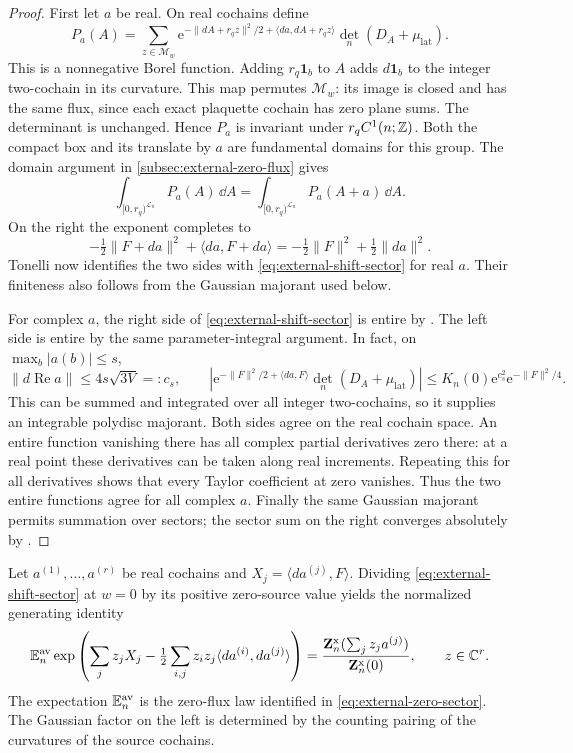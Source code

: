 \begin{proof}
First let $a$ be real. On real cochains define
\[
 P_a(A)=\sum_{z\in\mathcal M_w}
  \mathrm e^{-\|dA+r_qz\|^2/2+\langle da,dA+r_qz\rangle}
                            \det_n(D_A+\mu_{\mathrm{lat}}).
\]
This is a nonnegative Borel function. Adding
$r_q\mathbf1_b$ to $A$ adds $d\mathbf1_b$ to the
integer two-cochain in its curvature. This map
permutes $\mathcal M_w$: its image is closed
and has the same flux, since each exact plaquette
cochain has zero plane sums. The determinant
is unchanged. Hence $P_a$ is invariant under
$r_qC^1(n;\mathbb Z)$. Both the compact box and its
translate by $a$ are fundamental domains for
this group. The domain argument in
\cref{subsec:external-zero-flux} gives
\[
 \int_{[0,r_q)^{\mathcal L_n}}P_a(A)\,\dd A
        =\int_{[0,r_q)^{\mathcal L_n}}P_a(A+a)\,\dd A.
\]
On the right the exponent completes to
\[
 -\tfrac12\|F+da\|^2+\langle da,F+da\rangle
                  =-\tfrac12\|F\|^2+\tfrac12\|da\|^2.
\]
Tonelli now identifies the two sides with
\eqref{eq:external-shift-sector} for real $a$.
Their finiteness also follows from the Gaussian
majorant used below.

For complex $a$, the right side of
\eqref{eq:external-shift-sector} is entire by
.
The left side is entire by the same
parameter-integral argument. In fact, on
$\max_b|a(b)|\le s$,
\[
 \|d\operatorname{Re}a\|\le4s\sqrt{3V}=:c_s,
 \qquad
 \left|\mathrm e^{-\|F\|^2/2+\langle da,F\rangle}
                            \det_n(D_A+\mu_{\mathrm{lat}})\right|
                  \le K_n(0)\mathrm e^{c_s^2}\mathrm e^{-\|F\|^2/4}.
\]
This can be summed and integrated over all integer
two-cochains, so it supplies an integrable polydisc
majorant. Both sides agree on the real cochain
space. An entire function vanishing there has
all complex partial derivatives zero there:
at a real point these derivatives can be taken
along real increments. Repeating this for all
derivatives shows that every Taylor coefficient
at zero vanishes. Thus the two entire functions
agree for all complex $a$.
Finally the same Gaussian majorant permits
summation over sectors; the sector sum on the
right converges absolutely by
.
\end{proof}

Let $a^{(1)},\ldots,a^{(r)}$ be real cochains and
$X_j=\langle da^{(j)},F\rangle$. Dividing
\eqref{eq:external-shift-sector} at $w=0$ by its
positive zero-source value yields the normalized
generating identity
\begin{equation}\label{eq:external-generating-general}
 \mathbb E_n^{\mathrm{av}}\exp\left(
       \sum_jz_jX_j-\tfrac12\sum_{i,j}
                  z_iz_j\langle da^{(i)},da^{(j)}\rangle\right)
 =
 \frac{\mathbf Z_n^{\mathrm{x}}(\sum_jz_ja^{(j)})}
                         {\mathbf Z_n^{\mathrm{x}}(0)},
                                                   \qquad z\in\mathbb C^r.
\end{equation}
The expectation $\mathbb E_n^{\mathrm{av}}$ is the zero-flux
law identified in \eqref{eq:external-zero-sector}.
The Gaussian factor on the left is determined by
the counting pairing of the curvatures of the
source cochains.

